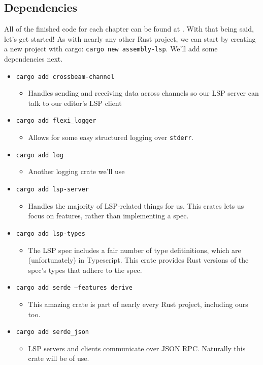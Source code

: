\subsection{Dependencies}
All of the finished code for each chapter can be found at \URL. With that being said,
let's get started! As with nearly any other Rust project, we can start by creating a new
project with cargo: \texttt{cargo new assembly-lsp}. We'll add some dependencies
next.

\begin{itemize}
	\item \texttt{cargo add crossbeam-channel}
	      \begin{itemize}
		      \item Handles sending and receiving data across channels so our LSP server
		            can talk to our editor's LSP client
	      \end{itemize}
	\item \texttt{cargo add flexi\_logger}
	      \begin{itemize}
		      \item Allows for some easy structured logging over \texttt{stderr}.
	      \end{itemize}
	\item \texttt{cargo add log}
	      \begin{itemize}
		      \item Another logging crate we'll use
	      \end{itemize}
	\item \texttt{cargo add lsp-server}
	      \begin{itemize}
		      \item Handles the majority of LSP-related things for us. This crates
		            lets us focus on features, rather than implementing a spec.
	      \end{itemize}
	\item \texttt{cargo add lsp-types}
	      \begin{itemize}
		      \item The LSP spec includes a fair number of type defitinitions, which
		            are (unfortunately) in Typescript. This crate provides Rust versions
		            of the spec's types that adhere to the spec.
	      \end{itemize}
	\item \texttt{cargo add serde --features derive}
	      \begin{itemize}
		      \item This amazing crate is part of nearly every Rust project, including
		            ours too.
	      \end{itemize}
	\item \texttt{cargo add serde\_json}
	      \begin{itemize}
		      \item LSP servers and clients communicate over JSON RPC. Naturally this
		            crate will be of use.
	      \end{itemize}
\end{itemize}

